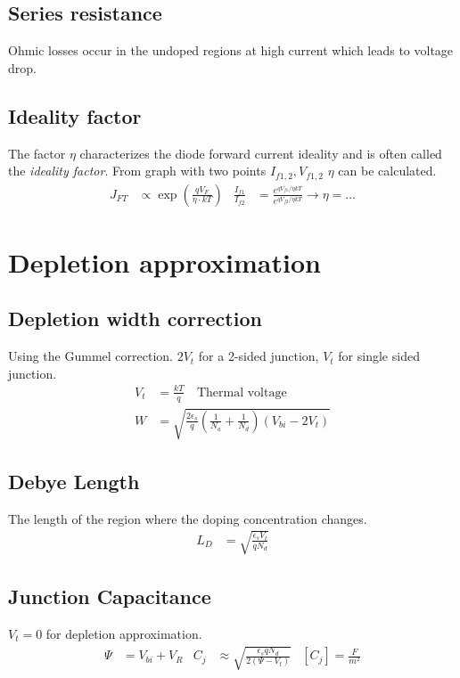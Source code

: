 \documentclass[a4paper, fontsize=8pt, landscape, DIV=1]{scrartcl}
\begin{document}
\begin{multicols*}{4}
    \subsection{Series resistance}
    Ohmic losses occur in the undoped regions at high current which leads to voltage drop.

    \subsection{Ideality factor}
    The factor $\eta$ characterizes the diode forward current ideality and is often called the \textit{ideality factor}.
    From graph with two points $I_{f1,2}, V_{f1,2}$ $\eta$ can be calculated.
    \begin{align*}
      J_{FT} &\propto \exp\left(\frac{qV_F}{\eta\cdot kT}\right) & 
      \frac{I_{f1}}{I_{f2}} &= \frac{e^{ qV_{f1}/\eta kT }} {e^{ qV_{f2}/\eta kT }} \to\eta=\dots
    \end{align*}

    \section{Depletion approximation}
    \subsection{Depletion width correction}
    Using the Gummel correction.
    $2V_t$ for a 2-sided junction, $V_t$ for single sided junction.
    \begin{align*}
      V_t &= \frac{kT}{q} \quad\text{Thermal voltage} \\
      W &= \sqrt{\frac{2\epsilon_s}{q}\left(\frac{1}{N_a} + \frac{1}{N_d}\right)(V_{bi}-2V_t)}
    \end{align*}

    \subsection{Debye Length}
    The length of the region where the doping concentration changes.
    \begin{align*}
      L_D &= \sqrt{\frac{\epsilon_sV_t}{qN_d}}
    \end{align*}

    \subsection{Junction Capacitance}
    $V_t=0$ for depletion approximation.
    \begin{align*}
      \Psi &= V_{bi} + V_R &
      C_j &\approx \sqrt{\frac{\epsilon_sqN_d}{2(\Psi - V_t)}} &
      [C_j] = \frac{F}{m^2}
    \end{align*}


\end{multicols*}
\end{document}
